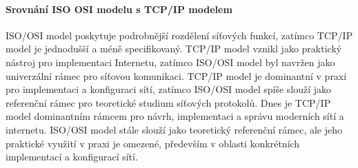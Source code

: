 \paragraph{Srovnání ISO OSI modelu s TCP/IP modelem}
ISO/OSI model poskytuje podrobnější rozdělení síťových funkcí, zatímco TCP/IP model je jednodušší a méně specifikovaný. TCP/IP model vznikl jako praktický nástroj pro implementaci Internetu, zatímco ISO/OSI model byl navržen jako univerzální rámec pro síťovou komunikaci. TCP/IP model je dominantní v praxi pro implementaci a konfiguraci sítí, zatímco ISO/OSI model spíše slouží jako referenční rámec pro teoretické studium síťových protokolů. Dnes je TCP/IP model dominantním rámcem pro návrh, implementaci a správu moderních sítí a internetu. ISO/OSI model stále slouží jako teoretický referenční rámec, ale jeho praktické využití v praxi je omezené, především v oblasti konkrétních implementací a konfigurací sítí.